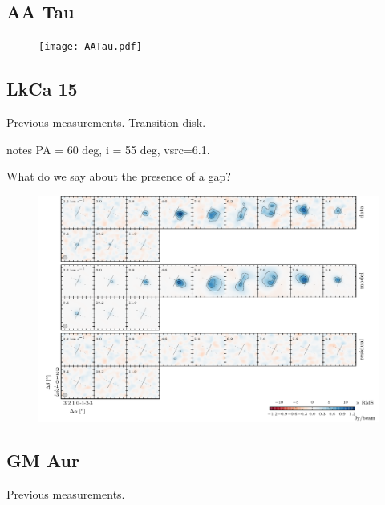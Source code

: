 \documentclass[twocolumn]{aastex6}
\begin{document}
\subsection{AA Tau}

\begin{figure}[htb]
\begin{center}
  \texttt{[image: AATau.pdf]}
  \end{center}
\end{figure}

\subsection{LkCa 15}
Previous measurements. Transition disk.

\citep{vandermarel15} notes PA = 60 deg, i = 55 deg,  vsrc=6.1.

What do we say about the presence of a gap?

\begin{figure}[htb]
\begin{center}
  \includegraphics{LkCa15.pdf}
  \end{center}
\end{figure}

\subsection{GM Aur}
Previous measurements.
\end{document}
